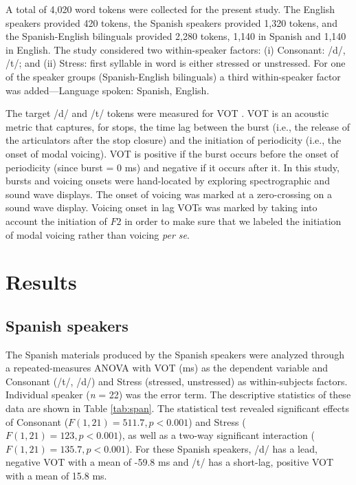\documentclass[a4paper]{article}
\begin{document}
A total of 4,020 word tokens were collected for the present study. The English speakers provided 420 tokens, the Spanish speakers provided 1,320 tokens, and the Spanish-English bilinguals provided 2,280 tokens, 1,140 in Spanish and 1,140 in English. The study considered two within-speaker factors: (i) Consonant: /d/, /t/; and (ii) Stress: first syllable in word is either stressed or unstressed. For one of the speaker groups (Spanish-English bilinguals) a third within-speaker factor was added---Language spoken: Spanish, English.

The target /d/ and /t/ tokens were measured for VOT \cite{lisker1963crosslanguage}. VOT is an acoustic metric that captures, for stops, the time lag between the burst (i.e., the release of the articulators after the stop closure) and the initiation of periodicity (i.e., the onset of modal voicing). VOT is positive if the burst occurs before the onset of periodicity (since burst = 0 ms) and negative if it occurs after it. In this study, bursts and voicing onsets were hand-located by exploring spectrographic and sound wave displays. The onset of voicing was marked at a zero-crossing on a sound wave display. Voicing onset in lag VOTs was marked by taking into account the initiation of $F2$ in order to make sure that we labeled the initiation of modal voicing rather than voicing \emph{per se}.

\section{Results}

\subsection{Spanish speakers}

The Spanish materials produced by the Spanish speakers were analyzed through a repeated-measures ANOVA with VOT (ms) as the dependent variable and Consonant (/t/, /d/) and Stress (stressed, unstressed) as within-subjects factors. Individual speaker (\emph{n} = 22) was the error term. The descriptive statistics of these data are shown in Table \ref{tab:span}. The statistical test revealed significant effects of Consonant ($F(1,21) = 511.7, p < 0.001$) and Stress ($F(1,21) = 123, p < 0.001$), as well as a two-way significant interaction ($F(1,21) = 135.7, p < 0.001$). For these Spanish speakers, /d/ has a lead, negative VOT with a mean of -59.8 ms and /t/ has a short-lag, positive VOT with a mean of 15.8 ms.
\end{document}
